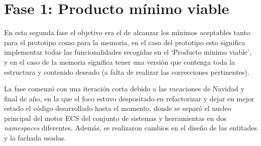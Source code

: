 \section{Fase 1: Producto mínimo viable}
En esta segunda fase el objetivo era el de alcanzar los mínimos aceptables tanto para el prototipo
como para la memoria, en el caso del prototipo esto significa implementar todas las funcionalidades
recogidas en el `Producto mínimo viable', y en el caso de la memoria significa tener una versión
que contenga toda la estructura y contenido deseado (a falta de realizar las correcciones
pertinentes).

La fase comenzó con una iteración corta debido a las vacaciones de Navidad y final de año, en la
que el foco estuvo despositado en refactorizar y dejar en mejor estado el código desarrollado
hasta el momento, donde se separó el nucleo principal del motor \ac{ECS} del conjunto de sistemas y
herramientas en dos \textit{namespaces} diferentes. Además, se realizaron cambios en el diseño
de las entitades y la fachada usadas.

